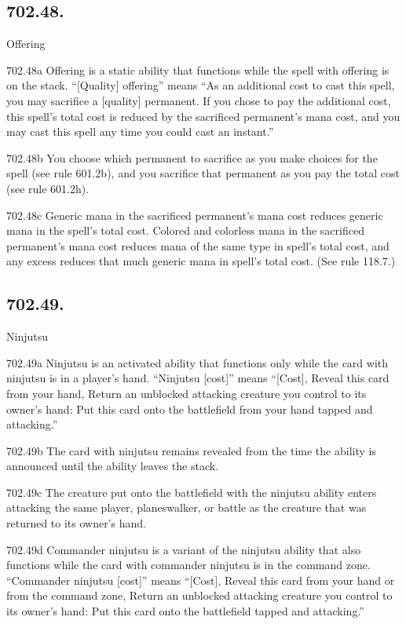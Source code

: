 \subsection*{702.48.}
Offering

702.48a Offering is a static ability that functions while the spell with offering is on the stack. “[Quality] offering” means “As an additional cost to cast this spell, you may sacrifice a [quality] permanent. If you chose to pay the additional cost, this spell’s total cost is reduced by the sacrificed permanent’s mana cost, and you may cast this spell any time you could cast an instant.”

702.48b You choose which permanent to sacrifice as you make choices for the spell (see rule 601.2b), and you sacrifice that permanent as you pay the total cost (see rule 601.2h).

702.48c Generic mana in the sacrificed permanent’s mana cost reduces generic mana in the spell’s total cost. Colored and colorless mana in the sacrificed permanent’s mana cost reduces mana of the same type in spell’s total cost, and any excess reduces that much generic mana in spell’s total cost. (See rule 118.7.)

\subsection*{702.49.}
Ninjutsu

702.49a Ninjutsu is an activated ability that functions only while the card with ninjutsu is in a player’s hand. “Ninjutsu [cost]” means “[Cost], Reveal this card from your hand, Return an unblocked attacking creature you control to its owner’s hand: Put this card onto the battlefield from your hand tapped and attacking.”

702.49b The card with ninjutsu remains revealed from the time the ability is announced until the ability leaves the stack.

702.49c The creature put onto the battlefield with the ninjutsu ability enters attacking the same player, planeswalker, or battle as the creature that was returned to its owner’s hand.

702.49d Commander ninjutsu is a variant of the ninjutsu ability that also functions while the card with commander ninjutsu is in the command zone. “Commander ninjutsu [cost]” means “[Cost], Reveal this card from your hand or from the command zone, Return an unblocked attacking creature you control to its owner’s hand: Put this card onto the battlefield tapped and attacking.”

